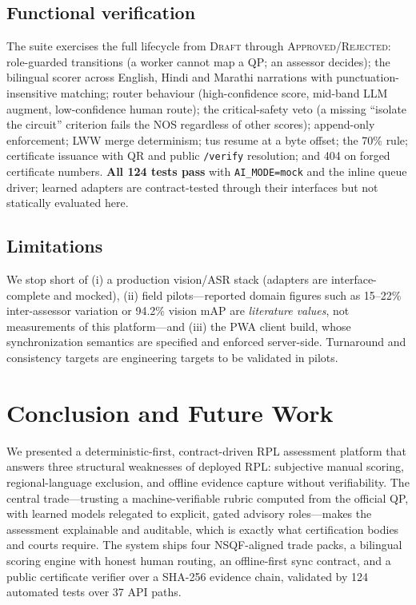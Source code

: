 \documentclass[conference]{IEEEtran}
\begin{document}
\subsection{Functional verification}
The suite exercises the full lifecycle from \textsc{Draft} through
\textsc{Approved}/\textsc{Rejected}: role-guarded transitions (a worker cannot map a QP; an
assessor decides); the bilingual scorer across English, Hindi and Marathi narrations with
punctuation-insensitive matching; router behaviour (high-confidence score, mid-band LLM
augment, low-confidence human route); the critical-safety veto (a missing ``isolate the
circuit'' criterion fails the NOS regardless of other scores); append-only enforcement; LWW
merge determinism; tus resume at a byte offset; the 70\% rule; certificate issuance with QR
and public \texttt{/verify} resolution; and 404 on forged certificate numbers. \textbf{All
124 tests pass} with \texttt{AI\_MODE=mock} and the inline queue driver; learned adapters
are contract-tested through their interfaces but not statically evaluated here.

\subsection{Limitations}
We stop short of (i) a production vision/ASR stack (adapters are interface-complete and
mocked), (ii) field pilots---reported domain figures such as 15--22\% inter-assessor
variation or 94.2\% vision mAP are \emph{literature values}, not measurements of this
platform---and (iii) the PWA client build, whose synchronization semantics are specified and
enforced server-side. Turnaround and consistency targets are engineering targets to be
validated in pilots.

\section{Conclusion and Future Work}
We presented a deterministic-first, contract-driven RPL assessment platform that answers
three structural weaknesses of deployed RPL: subjective manual scoring, regional-language
exclusion, and offline evidence capture without verifiability. The central trade---trusting
a machine-verifiable rubric computed from the official QP, with learned models relegated to
explicit, gated advisory roles---makes the assessment explainable and auditable, which is
exactly what certification bodies and courts require. The system ships four NSQF-aligned
trade packs, a bilingual scoring engine with honest human routing, an offline-first sync
contract, and a public certificate verifier over a SHA-256 evidence chain, validated by 124
automated tests over 37 API paths.
\end{document}
